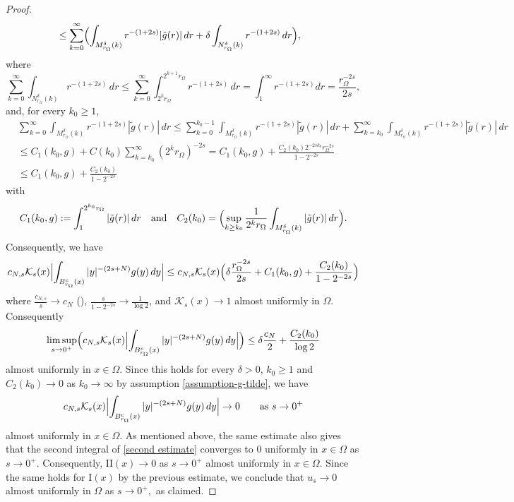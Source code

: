 \documentclass[notitlepage,11pt,reqno]{amsart}
\theoremstyle{definition}
\numberwithin{equation}{section}
\begin{document}
\begin{proof}
\begin{align*}
&\le \sum_{k=0}^{\infty}\Bigl(\int_{M^{\delta}_{r_{\Omega}}(k)} r^{-(1+2s)}|\tilde{g}(r)|\, dr+ \delta \int_{N^{\delta}_{r_{\Omega}}(k)} r^{-(1+2s)}\, dr\Bigr),
\end{align*}
where 
\begin{equation*}%
  \sum_{k=0}^{\infty}\int_{N^{\delta}_{r_{\Omega}}(k)}r^{-(1+2s)}\, dr \le \sum_{k=0}^{\infty} \int_{2^k r_\Omega}^{2^{k+1} r_\Omega}r^{-(1+2s)}\,dr = \int_{1}^\infty r^{-(1+2s)}dr = \frac{r^{-2s}_{\Omega}}{2s},
\end{equation*}
and, for every $k_0 \ge 1$,
\begin{align*}%
 & \sum_{k=0}^{\infty} \int_{M^{\delta}_{r_{\Omega}}(k)} r^{-(1+2s)}|\tilde{g}(r)|\, dr\leq 
                                                                                     \sum_{k=0}^{k_0-1} \int_{M^{\delta}_{r_{\Omega}}(k)} r^{-(1+2s)}|\tilde{g}(r)|\, dr + \sum_{k=k_0}^{\infty} \int_{M^{\delta}_{r_{\Omega}}(k)} r^{-(1+2s)}|\tilde{g}(r)|\, dr\\
  &\le C_1(k_0,g) + C(k_0)\sum_{k=k_0}^\infty (2^{k} r_\Omega)^{-2s}= C_1(k_0,g)  + \frac{C_2(k_0) 2^{-2s k_0} r_\Omega^{-2s}}{1-2^{-2s}}\\
&\le C_1(k_0,g) + \frac{C_2(k_0)}{1-2^{-2s}}  
\end{align*}
with
$$
C_1(k_0,g) := \int_{1}^{2^{k_0} r_\Omega}|\tilde{g}(r)|\, dr \quad \text{and}\quad C_2(k_0) = \Bigl(\sup_{k \ge k_0} \frac{1}{2^{k}r_\Omega}\int_{M^{\delta}_{r_{\Omega}}(k)}|\tilde{g}(r)|\, dr\Bigr).
$$
Consequently, we have
\begin{align*}
c_{N, s}\mathcal{K}_s(x) \Bigl|\int_{B^c_{r_{\Omega}}(x)} |y|^{-(2s+N)}g(y)\, dy\Bigr| \le c_{N, s}\mathcal{K}_s(x)\Bigl(\delta \frac{r^{-2s}_{\Omega}}{2s} + C_1(k_0,g) + \frac{C_2(k_0)}{1-2^{-2s}}  \Bigr)
\end{align*}
where $\frac{c_{N, s}}{s} \to c_N$ (),  $\frac{s}{1-2^{-2s}} \to \frac{1}{\log 2}$, and $\mathcal{K}_s(x) \to 1$ almost uniformly in $\Omega$. Consequently
$$
\limsup_{s \to 0^+}\Bigl( c_{N, s}\mathcal{K}_s(x) \Bigl|\int_{B^c_{r_{\Omega}}(x)} |y|^{-(2s+N)}g(y)\, dy\Bigr|\Bigr) \le \delta \frac{c_N}{2} + \frac{C_2(k_0)}{\log 2}
$$
almost uniformly in $x \in \Omega$. Since this holds for every $\delta>0$, $k_0 \ge 1$ and $C_2(k_0) \to 0$ as $k_0 \to \infty$ by assumption \eqref{assumption-g-tilde}, we have
$$
c_{N, s}\mathcal{K}_s(x) \Bigl|\int_{B^c_{r_{\Omega}}(x)} |y|^{-(2s+N)}g(y)\, dy\Bigr| \to 0 \qquad \text{as $s \to 0^+$}
$$
almost uniformly in $x \in \Omega$. As mentioned above, the same estimate also gives that the second integral of \eqref{second estimate} converges to $0$ uniformly in $x \in \Omega$ as $s \to 0^+$. Consequently, $\mathrm{II}(x) \to 0$ as $s \to 0^+$ almost uniformly in $x \in \Omega$. Since the same holds for $\mathrm{I}(x)$ by the previous estimate, we conclude that $u_s \to 0$ almost uniformly in $\Omega$ as $s\to 0^+,$ as claimed.
\end{proof}
\end{document}
